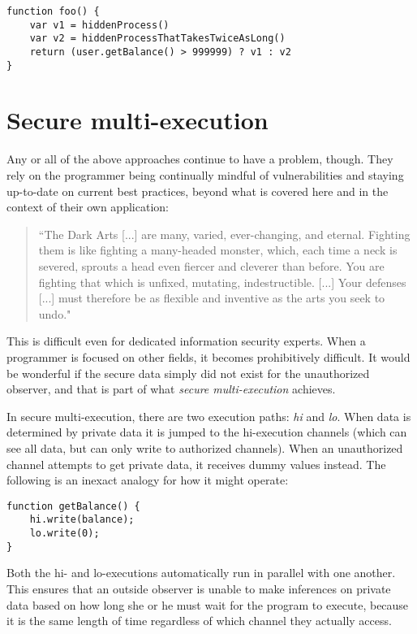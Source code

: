 \documentclass[12pt,a4paper]{article}
\begin{document}
		\begin{lstlisting}
function foo() {
	var v1 = hiddenProcess()
	var v2 = hiddenProcessThatTakesTwiceAsLong()
	return (user.getBalance() > 999999) ? v1 : v2
}
		\end{lstlisting}
		
		
	\section{Secure multi-execution}
		
		Any or all of the above approaches continue to have a problem, though. They rely on the programmer being continually mindful of vulnerabilities and staying up-to-date on current best practices, beyond what is covered here and in the context of their own application:
		
		\blockcquote{HarryPotter}{“The Dark Arts [...] are many, varied, ever-changing, and eternal. Fighting them is like fighting a many-headed monster, which, each time a neck is severed, sprouts a head even fiercer and cleverer than before. You are fighting that which is unfixed, mutating, indestructible. [...] Your defenses [...] must therefore be as flexible and inventive as the arts you seek to undo."}
		
		This is difficult even for dedicated information security experts. When a programmer is focused on other fields, it becomes prohibitively difficult. It would be wonderful if the secure data simply did not exist for the unauthorized observer, and that is part of what \textit{secure multi-execution}\cite{DevriesePiessens2010, JaskelioffRusso2012, RafnssonSabelfeld2013} achieves.
		
		In secure multi-execution, there are two execution paths: \textit{hi} and \textit{lo}. When data is determined by private data it is jumped to the hi-execution channels (which can see all data, but can only write to authorized channels). When an unauthorized channel attempts to get private data, it receives dummy values instead. The following is an inexact analogy for how it might operate:
		
		\begin{lstlisting}
function getBalance() {
	hi.write(balance);
	lo.write(0);
}
		\end{lstlisting}
		
		Both the hi- and lo-executions automatically run in parallel with one another. This ensures that an outside observer is unable to make inferences on private data based on how long she or he must wait for the program to execute, because it is the same length of time regardless of which channel they actually access. 
	
\end{document}
